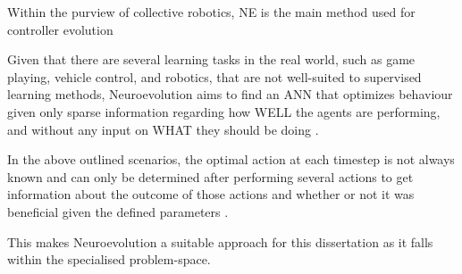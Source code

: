 
Within the purview of collective robotics, NE is the main method used for controller evolution


Given that there are several learning tasks in the real world, such as game playing, vehicle control, and robotics, that are not well-suited to supervised learning methods, Neuroevolution aims to find an ANN that optimizes behaviour given only sparse information regarding how WELL the agents are performing, and without any input on WHAT they should be doing \cite{Miikkulainen2010}. 

In the above outlined scenarios, the optimal action at each timestep is not always known and can only be determined after performing several actions to get information about the outcome of those actions and whether or not it was beneficial given the defined parameters \cite{Miikkulainen2010}.

This makes Neuroevolution a suitable approach for this dissertation as it falls within the specialised problem-space.


